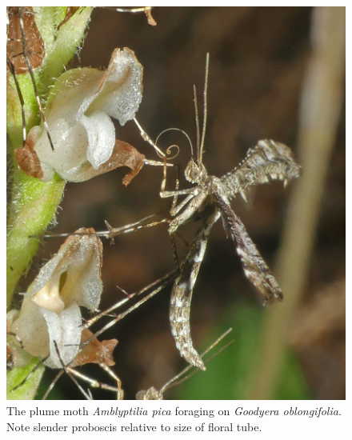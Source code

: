 \begin{multicols}{2}
\begin{figure}[H]
\begin{center}
\vspace{2mm}
\includegraphics[width=\textwidth]{img/Goodyera_oblongifolia_Amblyptilia_pica.jpg}
\caption{The plume moth \emph{Amblyptilia pica} foraging on \emph{Goodyera oblongifolia}. Note slender proboscis relative to size of floral tube.}
\label{Goodyera_oblongifolia_Amblyptilia_pica}
\end{center}
\end{figure}





\end{multicols}
